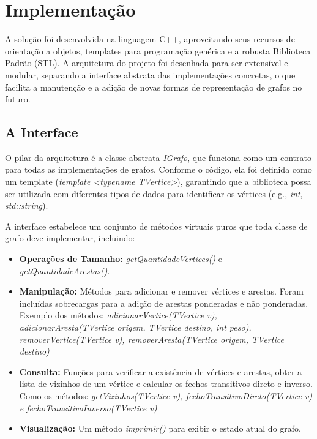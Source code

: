 \documentclass{sbc2023}%
\begin{document}
\section{Implementação}
\label{implementacao}

    A solução foi desenvolvida na linguagem C++, aproveitando seus recursos de orientação a objetos, templates para programação genérica e a robusta Biblioteca Padrão (STL). A arquitetura do projeto foi desenhada para ser extensível e modular, separando a interface abstrata das implementações concretas, o que facilita a manutenção e a adição de novas formas de representação de grafos no futuro.

    \subsection{A Interface}
    
    O pilar da arquitetura é a classe abstrata \textit{IGrafo}, que funciona como um contrato para todas as implementações de grafos. Conforme o código, ela foi definida como um template (\textit{template <typename TVertice>}), garantindo que a biblioteca possa ser utilizada com diferentes tipos de dados para identificar os vértices (e.g., \textit{int}, \textit{std::string}).
    
    A interface estabelece um conjunto de métodos virtuais puros que toda classe de grafo deve implementar, incluindo:
    
    \begin{itemize}
        \item \textbf{Operações de Tamanho:} \textit{getQuantidadeVertices()} e \textit{getQuantidadeArestas()}.
        \item \textbf{Manipulação:} Métodos para adicionar e remover vértices e arestas. Foram incluídas sobrecargas para a adição de arestas ponderadas e não ponderadas. Exemplo dos métodos: \textit{adicionarVertice(TVertice v), adicionarAresta(TVertice origem, TVertice destino, int peso), removerVertice(TVertice v), removerAresta(TVertice origem, TVertice destino)}
        \item \textbf{Consulta:} Funções para verificar a existência de vértices e arestas, obter a lista de vizinhos de um vértice e calcular os fechos transitivos direto e inverso. Como os métodos:  \textit{getVizinhos(TVertice v), fechoTransitivoDireto(TVertice v) e fechoTransitivoInverso(TVertice v) }
        \item \textbf{Visualização:} Um método \textit{imprimir()} para exibir o estado atual do grafo.
    \end{itemize}
    
\end{document}
